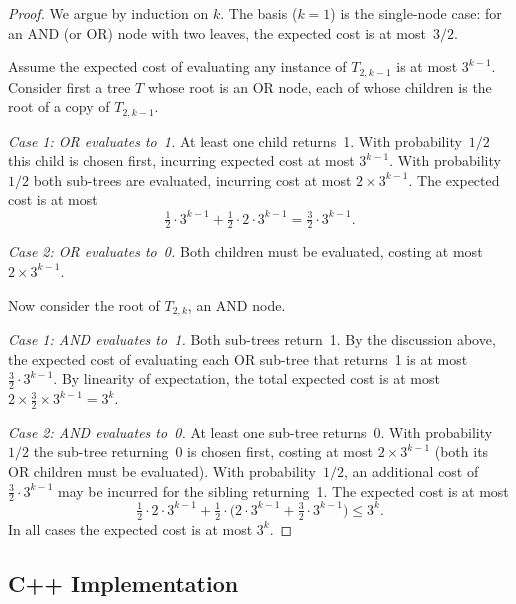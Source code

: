 \documentclass[twoside,12pt]{book}
\theoremstyle{plain}
\theoremstyle{definition}
\theoremstyle{remark}
\begin{document}
\begin{proof}
We argue by induction on $k$.  The basis ($k=1$) is the single-node case:
for an AND (or OR) node with two leaves, the expected cost is at most~$3/2$.

Assume the expected cost of evaluating any instance of $T_{2,k-1}$ is at
most $3^{k-1}$.  Consider first a tree $T$ whose root is an OR node, each of
whose children is the root of a copy of $T_{2,k-1}$.

\emph{Case 1: OR evaluates to~1.}
At least one child returns~1.  With probability~$1/2$ this child is chosen
first, incurring expected cost at most $3^{k-1}$.  With probability~$1/2$
both sub-trees are evaluated, incurring cost at most $2\times 3^{k-1}$.
The expected cost is at most
\[
  \tfrac{1}{2}\cdot 3^{k-1} + \tfrac{1}{2}\cdot 2\cdot 3^{k-1}
  = \tfrac{3}{2}\cdot 3^{k-1}.
\]

\emph{Case 2: OR evaluates to~0.}
Both children must be evaluated, costing at most $2\times 3^{k-1}$.

Now consider the root of $T_{2,k}$, an AND node.

\emph{Case 1: AND evaluates to~1.}
Both sub-trees return~1.  By the discussion above, the expected cost of
evaluating each OR sub-tree that returns~1 is at most
$\frac{3}{2}\cdot 3^{k-1}$.  By linearity of expectation, the total
expected cost is at most $2\times\frac{3}{2}\times 3^{k-1}=3^k$.

\emph{Case 2: AND evaluates to~0.}
At least one sub-tree returns~0.  With probability~$1/2$ the sub-tree
returning~0 is chosen first, costing at most $2\times 3^{k-1}$ (both its OR
children must be evaluated).  With probability~$1/2$, an additional cost of
$\frac{3}{2}\cdot 3^{k-1}$ may be incurred for the sibling returning~1.
The expected cost is at most
\[
  \tfrac{1}{2}\cdot 2\cdot 3^{k-1}
  + \tfrac{1}{2}\cdot\bigl(2\cdot 3^{k-1}+\tfrac{3}{2}\cdot 3^{k-1}\bigr)
  \le 3^k.
\]
In all cases the expected cost is at most $3^k$.
\end{proof}

\subsection{C++ Implementation}
\end{document}

